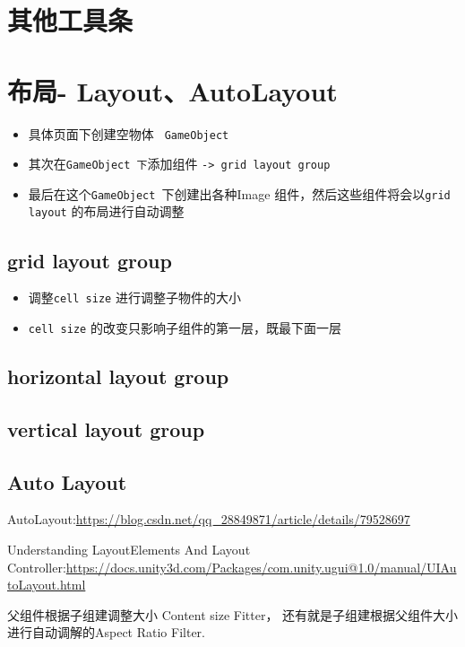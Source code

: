\documentclass[UTF8,a4paper,12pt]{ctexbook}
\begin{document}
	
	\section{其他工具条}
	
	\section{布局- Layout、AutoLayout}
		\begin{itemize}
			\item 具体页面下创建空物体 \verb| GameObject|
			\item 其次在\verb|GameObject 下|添加组件 \verb|-> grid layout group|
			\item 最后在这个\verb|GameObject |下创建出各种Image 组件，然后这些组件将会以\verb|grid layout| 的布局进行自动调整
		\end{itemize}
	
		\subsection{grid layout group}
			\begin{itemize}
				\item  调整\verb|cell size| 进行调整子物件的大小
				\item  \verb|cell size| 的改变只影响子组件的第一层，既最下面一层
			\end{itemize}
		
		\subsection{horizontal layout group}
		
		\subsection{vertical layout group}
	
	
		\subsection{Auto Layout}
			AutoLayout:\url{https://blog.csdn.net/qq_28849871/article/details/79528697}
			
			Understanding LayoutElements And Layout Controller:\url{https://docs.unity3d.com/Packages/com.unity.ugui@1.0/manual/UIAutoLayout.html}
		
			父组件根据子组建调整大小 Content size Fitter， 还有就是子组建根据父组件大小进行自动调解的Aspect Ratio Filter.
			
\end{document}

